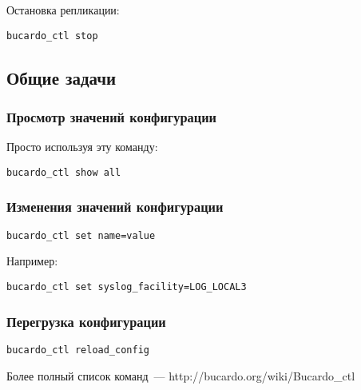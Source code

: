 Остановка репликации:
\begin{verbatim}
bucardo_ctl stop
\end{verbatim}

\subsection{Общие задачи}

\subsubsection{Просмотр значений конфигурации}
Просто используя эту команду:
\begin{verbatim}
bucardo_ctl show all
\end{verbatim}

\subsubsection{Изменения значений конфигурации}
\begin{verbatim}
bucardo_ctl set name=value
\end{verbatim}

Например:
\begin{verbatim}
bucardo_ctl set syslog_facility=LOG_LOCAL3
\end{verbatim}

\subsubsection{Перегрузка конфигурации}
\begin{verbatim}
bucardo_ctl reload_config
\end{verbatim}

Более полный список команд~--- http://bucardo.org/wiki/Bucardo\_ctl

